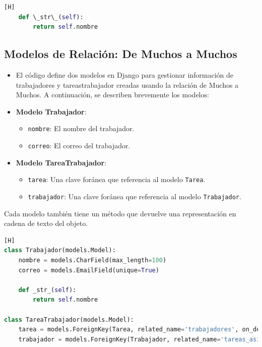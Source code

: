 \documentclass{article}
\begin{document}
\begin{itemize}
\begin{lstlisting}[language=Python,caption={models.py}][H]
    def \_str\_(self):
        return self.nombre

    \end{lstlisting}



\subsection{Modelos de Relación: De Muchos a Muchos}
\begin{itemize}
    \item El código define dos modelos en Django para gestionar información de trabajadores y tareastrabajador creadas usando la relación de Muchos a Muchos. A continuación, se describen brevemente los modelos:
\end{itemize}

\begin{itemize}
    \item \textbf{Modelo Trabajador}:
    \begin{itemize}
        \item \texttt{nombre}: El nombre del trabajador.
        \item \texttt{correo}: El correo del trabajador.
    \end{itemize}

    \item \textbf{Modelo TareaTrabajador}:
    \begin{itemize}
        \item \texttt{tarea}: Una clave foránea que referencia al modelo \texttt{Tarea}.
        \item \texttt{trabajador}: Una clave foránea que referencia al modelo \texttt{Trabajador}.
    \end{itemize}
\end{itemize}

Cada modelo también tiene un método que devuelve una representación en cadena de texto del objeto.

    \begin{lstlisting}[language=Python,caption={models.py}][H]
class Trabajador(models.Model):
    nombre = models.CharField(max_length=100)
    correo = models.EmailField(unique=True)

    def _str_(self):
        return self.nombre

class TareaTrabajador(models.Model):
    tarea = models.ForeignKey(Tarea, related_name='trabajadores', on_delete=models.CASCADE)
    trabajador = models.ForeignKey(Trabajador, related_name='tareas_asignadas', on_delete=models.CASCADE)


\end{lstlisting}
\end{itemize}
\end{document}
